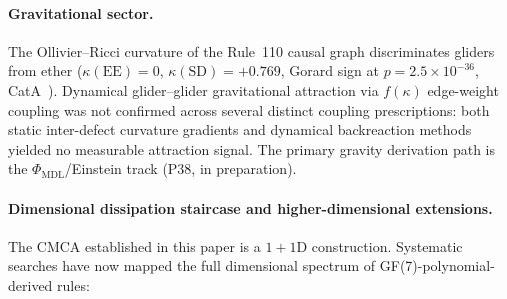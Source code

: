 \documentclass[11pt]{article}
\theoremstyle{remark}
\newcommand{\PHIMDL}{\Phi_{\mathrm{MDL}}}
\begin{document}
\paragraph{Gravitational sector.}
The Ollivier--Ricci curvature of the Rule~110 causal graph discriminates
gliders from ether ($\kappa(\text{EE})=0$, $\kappa(\text{SD})=+0.769$,
Gorard sign at $p=2.5\times10^{-36}$, CatA~\cite{Gorard2020Rel}).
Dynamical glider--glider gravitational attraction via $f(\kappa)$ edge-weight
coupling was not confirmed across several distinct coupling prescriptions:
both static inter-defect curvature gradients and dynamical backreaction
methods yielded no measurable attraction signal.  The primary gravity
derivation path is the $\PHIMDL$/Einstein track (P38, in preparation).

\paragraph{Dimensional dissipation staircase and higher-dimensional extensions.}
The CMCA established in this paper is a $1+1$D construction.
Systematic searches have now mapped the full dimensional spectrum of
GF(7)-polynomial-derived rules:
\end{document}

